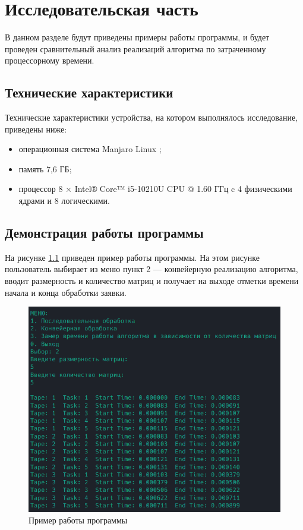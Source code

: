 \chapter{Исследовательская часть}

В данном разделе будут приведены примеры работы программы, и будет проведен сравнительный анализ реализаций алгоритма по затраченному процессорному времени.

\section{Технические характеристики}

Технические характеристики устройства, на котором выполнялось исследование, приведены ниже:

\begin{itemize}
	\item операционная система Manjaro Linux \cite{manjaro};
	\item память 7,6 ГБ;
	\item процессор 8 × Intel® Core™ i5-10210U CPU @ 1.60 ГГц \cite{intel} c 4 физическими ядрами и 8 логическими.
\end{itemize}

\clearpage

\section{Демонстрация работы программы}

На рисунке \ref{img:example} приведен пример работы программы. На этом рисунке пользователь выбирает из меню пункт 2 --- конвейерную реализацию алгоритма, вводит размерность и количество матриц и получает на выходе отметки времени начала и конца обработки заявки.

\begin{figure}[H]
	\begin{center}
		\includegraphics[scale=0.9]{img/example.png}
	\end{center}
	\captionsetup{justification=centering}
	\caption{Пример работы программы}
	\label{img:example}
\end{figure}

